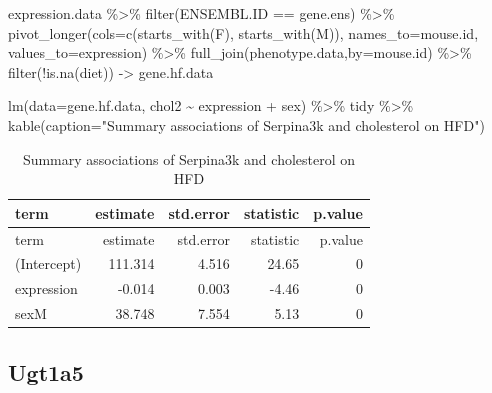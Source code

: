 \documentclass[
]{article}
\newenvironment{Shaded}{\begin{snugshade}}{\end{snugshade}}
\newcommand{\AttributeTok}[1]{\textcolor[rgb]{0.77,0.63,0.00}{#1}}
\newcommand{\FunctionTok}[1]{\textcolor[rgb]{0.00,0.00,0.00}{#1}}
\newcommand{\NormalTok}[1]{#1}
\newcommand{\OtherTok}[1]{\textcolor[rgb]{0.56,0.35,0.01}{#1}}
\newcommand{\SpecialCharTok}[1]{\textcolor[rgb]{0.00,0.00,0.00}{#1}}
\newcommand{\StringTok}[1]{\textcolor[rgb]{0.31,0.60,0.02}{#1}}
\begin{document}
\begin{Shaded}
\begin{Highlighting}[]
\NormalTok{expression.data }\SpecialCharTok{\%\textgreater{}\%}
  \FunctionTok{filter}\NormalTok{(ENSEMBL.ID }\SpecialCharTok{==}\NormalTok{ gene.ens) }\SpecialCharTok{\%\textgreater{}\%}
  \FunctionTok{pivot\_longer}\NormalTok{(}\AttributeTok{cols=}\FunctionTok{c}\NormalTok{(}\FunctionTok{starts\_with}\NormalTok{(}\StringTok{\textquotesingle{}F\textquotesingle{}}\NormalTok{),}
                      \FunctionTok{starts\_with}\NormalTok{(}\StringTok{\textquotesingle{}M\textquotesingle{}}\NormalTok{)),}
               \AttributeTok{names\_to=}\StringTok{\textquotesingle{}mouse.id\textquotesingle{}}\NormalTok{,}
               \AttributeTok{values\_to=}\StringTok{\textquotesingle{}expression\textquotesingle{}}\NormalTok{) }\SpecialCharTok{\%\textgreater{}\%}
  \FunctionTok{full\_join}\NormalTok{(phenotype.data,}\AttributeTok{by=}\StringTok{\textquotesingle{}mouse.id\textquotesingle{}}\NormalTok{) }\SpecialCharTok{\%\textgreater{}\%}
  \FunctionTok{filter}\NormalTok{(}\SpecialCharTok{!}\FunctionTok{is.na}\NormalTok{(diet)) }\OtherTok{{-}\textgreater{}}\NormalTok{ gene.hf.data}

\FunctionTok{lm}\NormalTok{(}\AttributeTok{data=}\NormalTok{gene.hf.data, chol2 }\SpecialCharTok{\textasciitilde{}}\NormalTok{ expression }\SpecialCharTok{+}\NormalTok{ sex) }\SpecialCharTok{\%\textgreater{}\%}
\NormalTok{  tidy }\SpecialCharTok{\%\textgreater{}\%}
  \FunctionTok{kable}\NormalTok{(}\AttributeTok{caption=}\StringTok{"Summary associations of Serpina3k and cholesterol on HFD"}\NormalTok{)}
\end{Highlighting}
\end{Shaded}

\begin{longtable}[]{@{}lrrrr@{}}
\caption{Summary associations of Serpina3k and cholesterol on
HFD}\tabularnewline
\toprule()
term & estimate & std.error & statistic & p.value \\
\midrule()
\endfirsthead
\toprule()
term & estimate & std.error & statistic & p.value \\
\midrule()
\endhead
(Intercept) & 111.314 & 4.516 & 24.65 & 0 \\
expression & -0.014 & 0.003 & -4.46 & 0 \\
sexM & 38.748 & 7.554 & 5.13 & 0 \\
\bottomrule()
\end{longtable}

\hypertarget{ugt1a5}{%
\subsection{Ugt1a5}\label{ugt1a5}}
\end{document}
